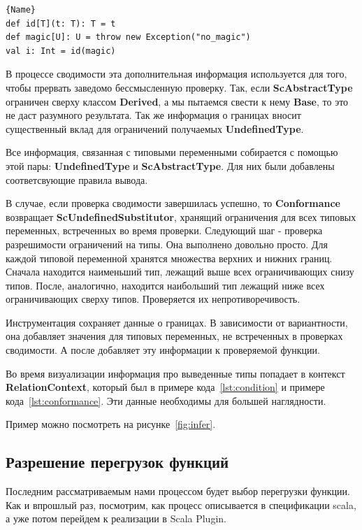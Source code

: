 \begin{lstlisting}[caption={Пример ScAbstractType},label=lst:abstract]{Name}
def id[T](t: T): T = t
def magic[U]: U = throw new Exception("no_magic")
val i: Int = id(magic)
\end{lstlisting}

В процессе сводимости эта дополнительная информация используется для
того, чтобы прервать заведомо бессмысленную проверку.
Так, если \textbf{ScAbstractType} ограничен сверху классом \textbf{Derived},
а мы пытаемся свести к нему \textbf{Base}, то это не даст разумного результата.
Так же информация о границах вносит существенный вклад для ограничений
получаемых \textbf{UndefinedType}.

Все информация, связанная с типовыми переменными собирается с помощью этой пары:
\textbf{UndefinedType} и \textbf{ScAbstractType}.
Для них были добавлены соответсвующие правила вывода.

В случае, если проверка сводимости завершилась успешно, то \textbf{Conformance}
возвращает \textbf{ScUndefinedSubstitutor}, хранящий ограничения для всех типовых
переменных, встреченных во время проверки.
Следующий шаг - проверка разрешимости ограничений на типы.
Она выполнено довольно просто.
Для каждой типовой переменной хранятся множества верхних и нижних границ.
Сначала находится наименьший тип, лежащий выше всех ограничивающих снизу типов.
После, аналогично, находится наибольший тип лежащий ниже всех ограничивающих
сверху типов.
Проверяется их непротиворечивость.

Инструментация сохраняет данные о границах.
В зависимости от вариантности, она добавляет значения для типовых переменных, не
встреченных в проверках сводимости.
А после добавляет эту информации к проверяемой функции.

Во время визуализации информация про выведенные типы попадает в контекст
\textbf{RelationContext}, который был в примере кода~\ref{lst:condition} и
примере кода~\ref{lst:conformance}.
Эти данные необходимы для большей наглядности.

Пример можно посмотреть на рисунке~\ref{fig:infer}.

\subsection{Разрешение перегрузок функций}
\label{sec:overloading}

Последним рассматриваемым нами процессом будет выбор перегрузки функции.
Как и впрошлый раз, посмотрим, как процесс описывается в спецификации scala,
а уже потом перейдем к реализации в Scala Plugin.

